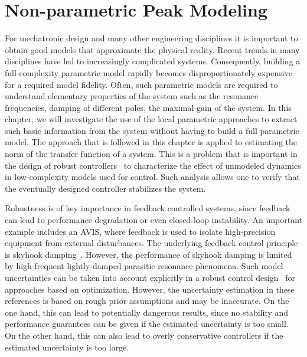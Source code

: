 \chapter{Non-parametric Peak Modeling}
\label{sec:hinf}
\def\thisDir{ch04-lrmhinf}
\glsresetall{}

\newcommand{\wnValue}{\ensuremath{0.95 \unit{rad/s}}}
\newcommand{\dampingValue}{\ensuremath{0.025}}
\newcommand{\TsValue}{\ensuremath{1 \unit{s}}}

For mechatronic design and many other engineering disciplines it is important to obtain good  models that approximate the physical reality.
Recent trends in many disciplines have led to increasingly complicated systems.
Consequently, building a full-complexity parametric model rapidly becomes disproportionately expensive for a required model fidelity.
Often, such parametric models are required to understand elementary properties of the system such as the resonance frequencies, damping of different poles, the maximal gain of the system.
In this chapter, we will investigate the use of the local parametric approaches to extract such basic information from the system without having to build a full parametric model.
The approach that is followed in this chapter is applied to estimating the \Hinf{} norm of the transfer function of a system.
This is a problem that is important in the design of robust controllers~\citep{Oomen2016} to characterize the effect of unmodeled dynamics in low-complexity models used for control.
Such analysis allows one to verify that the eventually designed controller stabilizes the system.

Robustness is of key importance in feedback controlled systems, since feedback can lead to performance degradation or even closed-loop instability.
An important example includes an \gls{AVIS}, where feedback is used to isolate high-precision equipment from external disturbances. 
The underlying feedback control principle is skyhook damping~\citep{Karnopp1995,Collette2011}. 
However, the performance of skyhook damping is limited by high-frequent lightly-damped parasitic resonance phenomena.
Such model uncertainties can be taken into account explicitly in a robust control design~\citep{Zhang2005HybridAvis} for approaches based on \Hinf{} optimization.
However, the uncertainty estimation in these references is based on rough prior assumptions and may be inaccurate. 
On the one hand, this can lead to potentially dangerous results, since no stability and performance guarantees can be given if the estimated uncertainty is too small. 
On the other hand, this can also lead to overly conservative controllers if the estimated uncertainty is too large.

